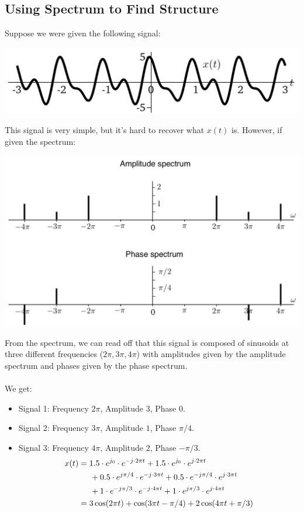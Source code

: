 \documentclass[10pt]{article}
\begin{document}
\subsection*{Using Spectrum to Find Structure}
Suppose we were given the following signal:
\begin{center}
    \includegraphics[scale=0.7]{W4_5.png} 
\end{center}
This signal is very simple, but it's hard to recover what $x(t)$ is.  However, if given the spectrum:
\begin{center}
    \includegraphics[scale=0.7]{W4_6.png}
\end{center}
From the spectrum, we can read off that this signal is composed of sinusoids at three different frequencies ($2\pi, 3\pi, 4\pi$) with amplitudes given by the amplitude spectrum and phases given by the phase spectrum.\\\\
We get:
\begin{itemize}
    \item Signal 1: Frequency $2\pi$, Amplitude $3$, Phase $0$.
    \item Signal 2: Frequency $3\pi$, Amplitude $1$, Phase $\pi/4$.
    \item Signal 3: Frequency $4\pi$, Amplitude $2$, Phase $-\pi/3$.
    \begin{align*}
        x(t) &= 1.5 \cdot e^{j_0} \cdot e^{-j \cdot 2\pi t} + 1.5 \cdot e^{j_0} \cdot e^{j \cdot 2\pi t}\\
        &\hspace{0.5cm}+ 0.5 \cdot e^{j\pi/4} \cdot e^{-j\cdot 3\pi t} + 0.5 \cdot e^{-j\pi/4} \cdot e^{j\cdot 3\pi t}\\
        &\hspace{0.5cm}+ 1 \cdot e^{-j\pi/3} \cdot e^{-j \cdot 4\pi t} + 1 \cdot e^{j\pi/3} \cdot e^{j \cdot 4\pi t}\\
        &= 3\cos(2\pi t) + \cos (3\pi t - \pi / 4) + 2\cos(4\pi t + \pi/3)
    \end{align*}
    
\end{itemize}
\end{document}

